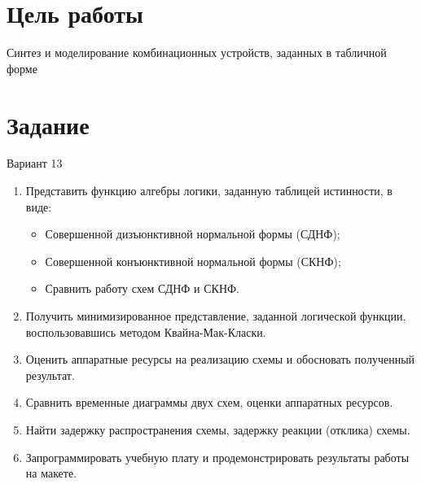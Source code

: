 \documentclass[a4paper,14pt]{article}
\begin{document}

\tableofcontents
\pagebreak

\section{Цель работы}

Синтез и моделирование комбинационных устройств, заданных в табличной форме

\section{Задание}

Вариант 13

\begin{enumerate}
\item Представить функцию алгебры логики, заданную таблицей истинности, в виде:
\begin{itemize}
\item Совершенной дизъюнктивной нормальной формы (СДНФ);

\item Совершенной конъюнктивной нормальной формы (СКНФ);

\item Сравнить работу схем СДНФ и СКНФ.
\end{itemize}

\item Получить минимизированное представление, заданной логической функции, воспользовавшись методом Квайна-Мак-Класки.

\item  Оценить аппаратные ресурсы на реализацию схемы и обосновать полученный 
результат.

\item  Сравнить временные диаграммы двух схем, оценки аппаратных ресурсов.

\item  Найти задержку распространения схемы, задержку реакции (отклика) схемы.

\item  Запрограммировать учебную плату и продемонстрировать результаты работы на макете.
\end{enumerate}
\end{document}
